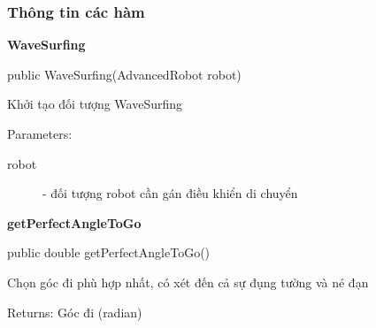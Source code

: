 \documentclass[14pt]{article}
\begin{document}
\subsubsection{Thông tin các hàm}
\textbf{WaveSurfing}\\
	\begin{description}
		\item public WaveSurfing(AdvancedRobot robot)
		\item Khởi tạo đối tượng WaveSurfing
		\item Parameters:
		\begin{description}
				\item[robot] - đối tượng robot cần gán điều khiển di chuyển
			\end{description}
	\end{description}
\vspace{0.5cm}
\textbf{getPerfectAngleToGo}
	\begin{description}
		\item public double getPerfectAngleToGo()
		\item Chọn góc đi phù hợp nhất, có xét đến cả sự đụng tường và né đạn
		\item Returns: Góc đi (radian)
	\end{description}
\end{document}
